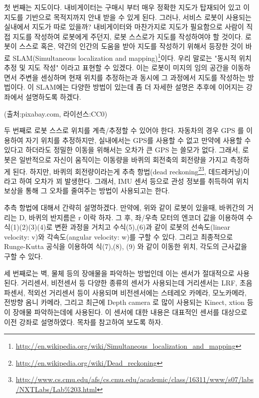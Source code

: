 첫 번째는 지도이다. 내비게이터는 구매시 부터 매우 정확한 지도가 탑재되어 있고 이 지도를 기반으로 목적지까지 안내 받을 수 있게 된다. 그러나, 서비스 로봇이 사용되는 실내에서 지도가 따로 있을까? 내비게이터와 마찬가지로 지도가 필요함으로 사람이 직접 지도를 작성하여 로봇에게 주던지, 로봇 스스로가 지도를 작성하여야 할 것이다. 로봇이 스스로 혹은, 약간의 인간의 도움을 받아 지도를 작성하기 위해서 등장한 것이 바로 SLAM(Simultaneous localization and mapping)\footnote{\url{http://en.wikipedia.org/wiki/Simultaneous_localization_and_mapping}}이다. 우리 말로는 "동시적 위치추정 및 지도 작성" 이라고 표현할 수 있겠다. 이는 로봇이 미지의 임의 공간을 이동하면서 주변을 센싱하며 현재 위치를 추정하는과 동시에 그 과정에서 지도를 작성하는 방법이다. 이 SLAM에는 다양한 방법이 있는데 좀 더 자세한 설명은 추후에 이어지는 강좌에서 설명하도록 하겠다.


(출처:pixabay.com, 라이선스:CC0)


두 번째로 로봇 스스로 위치를 계측/추정할 수 있어야 한다. 자동차의 경우 GPS 를 이용하여 자기 위치를 추정하지만, 실내에서는 GPS를 사용할 수 없고 만약에 사용할 수 있다고 하더라도 정밀한 이동을 위해서는 오차가 큰 GPS 는 쓸모가 없다. 그래서, 로봇은 일반적으로 자신이 움직이는 이동량을 바퀴의 회전축의 회전량을 가지고 측정하게 된다. 하지만, 바퀴의 회전량이라는게 추측 항법(dead reckoning\footnote{\url{http://en.wikipedia.org/wiki/Dead_reckoning}}\footnote{\url{http://www.cs.cmu.edu/afs/cs.cmu.edu/academic/class/16311/www/s07/labs/NXTLabs/Lab\%203.html}}, 데드레커닝)이라고 하여 오차가 꾀 발생한다. 그래서, IMU 센서 등으로 관성 정보를 취득하여 위치보상을 통해 그 오차를 줄여주는 방법이 사용되고는 한다.

추측 항법에 대해서 간략히 설명하겠다. 만약에, 위와 같이 로봇이 있을때, 바퀴간의 거리는 D, 바퀴의 반지름은 r 이락 하자. 그 후, 좌/우측 모터의 엔코더 값을 이용하여 수식(1)(2)(3)(4)로 변환 과정을 거치고 수식(5),(6)과 같이 로봇의 선속도(linear velocity: v)와 각속도(angular velocity: w)를 구할 수 있다. 그리고 최종적으로 Runge-Kutta 공식을 이용하여 식(7),(8), (9) 와 같이 이동한 위치, 각도의 근사값을 구할 수 있다.

세 번째로는 벽, 물체 등의 장애물을 파악하는 방법인데 이는 센서가 절대적으로 사용된다. 거리센서, 비전센서 등 다양한 종류의 센서가 사용되는데 거리센서는 LRF, 초음파센서, 적외선 거리센서 등이 사용되며 비전센서에는 스테레오 카메라, 모노카메라, 전방향 옴니 카메라, 그리고 최근에 Depth camera 로 많이 사용되는 Kinect, xtion 등이 장애물 파악하는데에 사용된다. 이 센서에 대한 내용은 대표적인 센서를 대상으로 이전 강좌로 설명하였다. 목차를 참고하여 보도록 하자.


